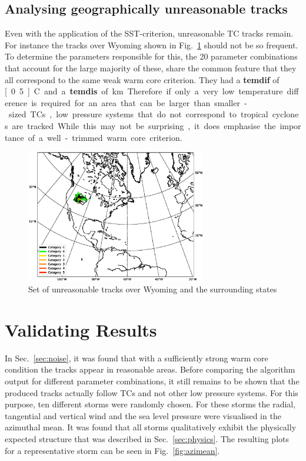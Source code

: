 \subsection*{Analysing geographically unreasonable tracks}
Even with the application of the SST-criterion, unreasonable TC tracks remain. For instance the tracks over Wyoming shown in Fig.~\ref{fig:rogue-tracks} should not be so frequent. To determine the parameters responsible for this, the 20 parameter combinations that account for the large majority of these, share the common feature that they all correspond to the same weak warm core criterion. They had a \textbf{temdif} of \unit[0.5]{\degree C} and a \textbf{temdis} of \unit[400]{km}. Therefore if only a very low temperature difference is required for an area that can be larger than smaller-sized TCs, low pressure systems that do not correspond to tropical cyclones are tracked. While this may not be surprising, it does emphasise the importance of a well-trimmed warm core criterion.
\begin{figure}[ht]
	\centering
	\includegraphics[width=0.7\textwidth]{img/rogue_tracks.eps}
	\caption{Set of unreasonable tracks over Wyoming and the surrounding states}
	\label{fig:rogue-tracks}
\end{figure}
\section{Validating Results}
In Sec.~\ref{sec:noise}, it was found that with a sufficiently strong warm core condition the tracks appear in reasonable areas. Before comparing the algorithm output for different parameter combinations, it still remains to be shown that the produced tracks actually follow TCs and not other low pressure systems. For this purpose, ten different storms were randomly chosen. For these storms the radial, tangential and vertical wind and the sea level pressure were visualised in the azimuthal mean. It was found that all storms qualitatively exhibit the physically expected structure that was described in Sec.~\ref{sec:physics}. The resulting plots for a representative storm can be seen in Fig.~\ref{fig:azimean}.

